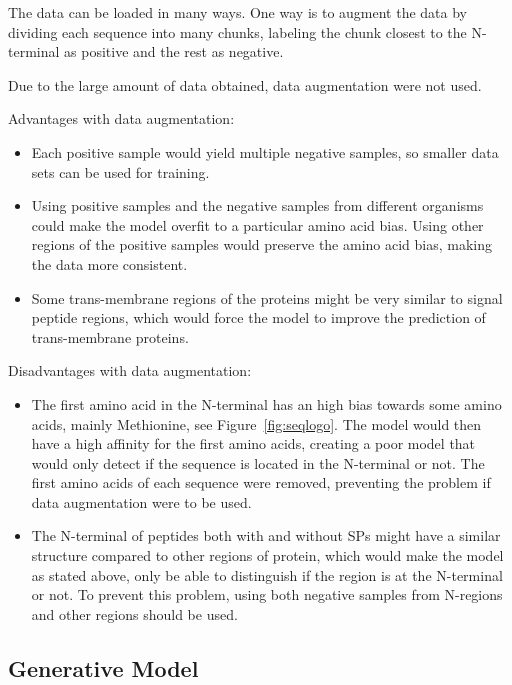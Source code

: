 The data can be loaded in many ways. One way is to augment the data by dividing each sequence into many chunks, labeling the chunk closest to the N-terminal as positive and the rest as negative.

Due to the large amount of data obtained, data augmentation were not used.
\linebreak

Advantages with data augmentation:
\begin{itemize}
\item Each positive sample would yield multiple negative samples, so smaller data sets can be used for training.
\item Using positive samples and the negative samples from different organisms could make the model overfit to a particular amino acid bias. Using other regions of the positive samples would preserve the amino acid bias, making the data more consistent.
\item Some trans-membrane regions of the proteins might be very similar to signal peptide regions, which would force the model to improve the prediction of trans-membrane proteins. 
\end{itemize}

Disadvantages with data augmentation:
\begin{itemize}
\item The first amino acid in the N-terminal has an high bias towards some amino acids, mainly Methionine, see Figure~\ref{fig:seqlogo}. The model would then have a high affinity for the first amino acids, creating a poor model that would only detect if the sequence is located in the N-terminal or not. The first amino acids of each sequence were removed, preventing the problem if data augmentation were to be used.
\item The N-terminal of peptides both with and without SPs might have a similar structure compared to other regions of protein, which would make the model as stated above, only be able to distinguish if the region is at the N-terminal or not. To prevent this problem, using both negative samples from N-regions and other regions should be used.
\end{itemize}

\subsection{Generative Model} \label{GAN}




